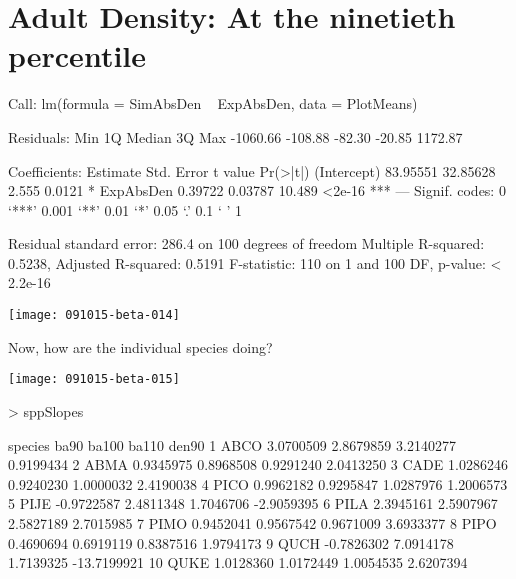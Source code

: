 \documentclass{article}
\begin{document}
\section{Adult Density: At the ninetieth percentile}
\begin{Schunk}
\begin{Soutput}
Call:
lm(formula = SimAbsDen ~ ExpAbsDen, data = PlotMeans)

Residuals:
     Min       1Q   Median       3Q      Max 
-1060.66  -108.88   -82.30   -20.85  1172.87 

Coefficients:
            Estimate Std. Error t value Pr(>|t|)    
(Intercept) 83.95551   32.85628   2.555   0.0121 *  
ExpAbsDen    0.39722    0.03787  10.489   <2e-16 ***
---
Signif. codes:  0 ‘***’ 0.001 ‘**’ 0.01 ‘*’ 0.05 ‘.’ 0.1 ‘ ’ 1

Residual standard error: 286.4 on 100 degrees of freedom
Multiple R-squared:  0.5238,	Adjusted R-squared:  0.5191 
F-statistic:   110 on 1 and 100 DF,  p-value: < 2.2e-16
\end{Soutput}
\end{Schunk}
\texttt{[image: 091015-beta-014]}

Now, how are the individual species doing?

\texttt{[image: 091015-beta-015]}
\begin{Schunk}
\begin{Sinput}
>   sppSlopes
\end{Sinput}
\begin{Soutput}
   species       ba90     ba100     ba110       den90
1     ABCO  3.0700509 2.8679859 3.2140277   0.9199434
2     ABMA  0.9345975 0.8968508 0.9291240   2.0413250
3     CADE  1.0286246 0.9240230 1.0000032   2.4190038
4     PICO  0.9962182 0.9295847 1.0287976   1.2006573
5     PIJE -0.9722587 2.4811348 1.7046706  -2.9059395
6     PILA  2.3945161 2.5907967 2.5827189   2.7015985
7     PIMO  0.9452041 0.9567542 0.9671009   3.6933377
8     PIPO  0.4690694 0.6919119 0.8387516   1.9794173
9     QUCH -0.7826302 7.0914178 1.7139325 -13.7199921
10    QUKE  1.0128360 1.0172449 1.0054535   2.6207394
\end{Soutput}
\end{Schunk}


\newpage
\end{document}
